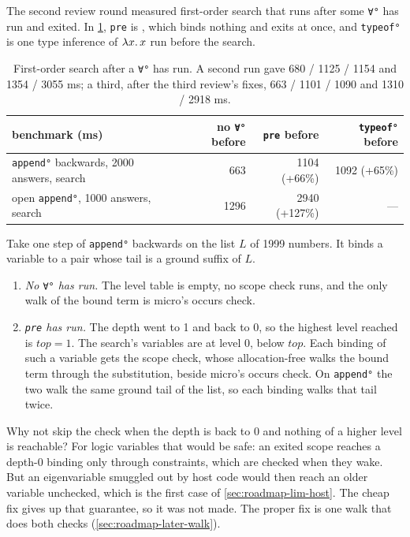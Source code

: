 The second review round measured first-order search that runs after some \texttt{∀°} has run and exited.
In \cref{tab:roadmap-perf-forall}, \texttt{pre} is , which binds nothing and exits at
once, and \texttt{typeof°} is one type inference of $\lambda x.\,x$ run before the search.
\begin{table}[h]
\small
\caption{First-order search after a \texttt{∀°} has run. A second run gave 680 / 1125 / 1154 and 1354 / 3055 ms; a third, after the third review's fixes, 663 / 1101 / 1090 and 1310 / 2918 ms.}\label{tab:roadmap-perf-forall}
\begin{tabular}{@{}>{\raggedright\arraybackslash}p{30mm}rrr@{}}
\toprule
benchmark (ms) & no \texttt{∀°} before & \texttt{pre} before & \texttt{typeof°} before \\
\midrule
\texttt{append°} backwards, 2000 answers, search & 663 & 1104 (+66\%) & 1092 (+65\%) \\
open \texttt{append°}, 1000 answers, search & 1296 & 2940 (+127\%) & --- \\
\bottomrule
\end{tabular}
\end{table}

\begin{tutorial}
Take one step of \texttt{append°} backwards on the list $L$ of 1999 numbers. It binds a variable to a
pair whose tail is a ground suffix of $L$.
\begin{enumerate}
  \item \emph{No \texttt{∀°} has run.} The level table is empty, no scope check runs, and the only walk of
    the bound term is micro's occurs check.
  \item \emph{\texttt{pre} has run.} The depth went to 1 and back to 0, so the highest level reached is
    $\mathit{top}=1$. The search's variables are at level 0, below $\mathit{top}$. Each binding of such a variable gets the
    scope check, whose allocation-free  walks the bound term through the
    substitution, beside micro's occurs check. On \texttt{append°} the two walk the same ground tail of the
    list, so each binding walks that tail twice.
\end{enumerate}
Why not skip the check when the depth is back to 0 and nothing of a higher level is reachable? For logic
variables that would be safe: an exited scope reaches a depth-0 binding only through constraints, which
are checked when they wake. But an eigenvariable smuggled out by host code would then reach an older
variable unchecked, which is the first case of \cref{sec:roadmap-lim-host}. The cheap fix gives up that
guarantee, so it was not made. The proper fix is one walk that does both checks (\cref{sec:roadmap-later-walk}).
\end{tutorial}

